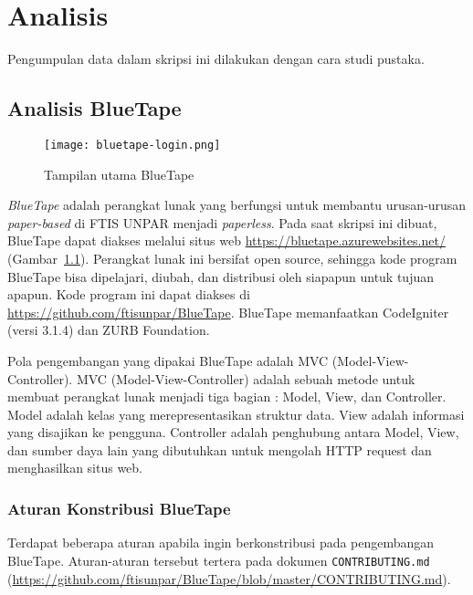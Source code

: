 
\chapter{Analisis}
\label{chap:analisis}
Pengumpulan data dalam skripsi ini dilakukan dengan cara studi pustaka.

\section{Analisis BlueTape}
\label{sec:analisisbluetape}
\begin{figure}[H]
	\centering  
	\texttt{[image: bluetape-login.png]}  
	\caption[Tampilan utama BlueTape]{Tampilan utama BlueTape} 
	\label{fig:bluetape-login} 
\end{figure}

\textit{BlueTape} adalah perangkat lunak yang berfungsi untuk membantu urusan-urusan \textit{paper-based} di FTIS UNPAR menjadi \textit{paperless}. Pada saat skripsi ini dibuat, BlueTape dapat diakses melalui situs web \url{https://bluetape.azurewebsites.net/} (Gambar~\ref{fig:bluetape-login}). Perangkat lunak ini bersifat open source, sehingga kode program BlueTape bisa dipelajari, diubah, dan distribusi oleh siapapun untuk tujuan apapun. Kode program ini dapat diakses di \url{https://github.com/ftisunpar/BlueTape}. BlueTape memanfaatkan CodeIgniter (versi 3.1.4) dan ZURB Foundation.

Pola pengembangan yang dipakai BlueTape adalah MVC (Model-View-Controller). MVC (Model-View-Controller) adalah sebuah metode untuk membuat perangkat lunak menjadi tiga bagian : Model, View, dan Controller. Model adalah kelas yang merepresentasikan struktur data. View adalah informasi yang disajikan ke pengguna. Controller adalah penghubung antara Model, View, dan sumber daya lain yang dibutuhkan untuk mengolah HTTP request dan menghasilkan situs web.

\subsection{Aturan Konstribusi BlueTape}
Terdapat beberapa aturan apabila ingin berkonstribusi pada pengembangan BlueTape. Aturan-aturan tersebut tertera pada dokumen \texttt{CONTRIBUTING.md} (\url{https://github.com/ftisunpar/BlueTape/blob/master/CONTRIBUTING.md}).

